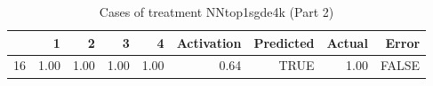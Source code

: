 \begin{table}[ht]
\centering
\begin{tabular}{rrrrrrrrr}
  \hline
 & 1 & 2 & 3 & 4 & Activation & Predicted & Actual & Error \\ 
  \hline
16 & 1.00 & 1.00 & 1.00 & 1.00 & 0.64 & TRUE & 1.00 & FALSE \\ 
   \hline
\end{tabular}
\caption{Cases of treatment NNtop1sgde4k (Part 2)} 
\end{table}
